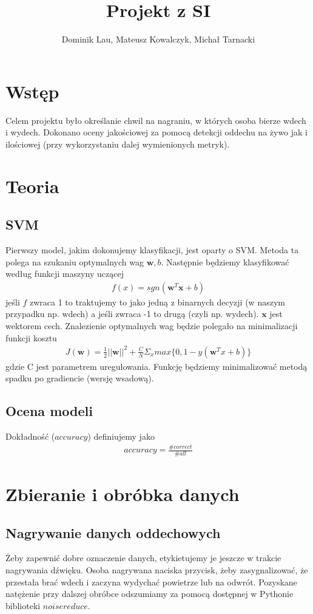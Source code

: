 \documentclass{article}
\title{Projekt z SI}
\author{Dominik Lau, Mateusz Kowalczyk, Michał Tarnacki}
\begin{document}
\maketitle

\section{Wstęp}
Celem projektu było określanie chwil na nagraniu, w których osoba bierze wdech i wydech. 
Dokonano oceny jakościowej za pomocą detekcji oddechu na żywo jak i ilościowej (przy wykorzystaniu
dalej wymienionych metryk).

\section{Teoria}
\subsection{SVM}
Pierwszy model, jakim dokonujemy klasyfikacji, jest oparty o SVM. Metoda ta polega na szukaniu optymalnych wag $\boldsymbol{w}, b$.
Następnie będziemy klasyfikować według funkcji maszyny uczącej 
\begin{gather*}
	f(x) = sgn(\boldsymbol{w}^T \boldsymbol{x} + b)
\end{gather*}
jeśli $f$ zwraca 1 to traktujemy to jako jedną z binarnych decyzji (w naszym przypadku np. wdech) a jeśli zwraca -1 to drugą (czyli np. wydech).
$\textbf{x}$ jest wektorem cech.  Znalezienie optymalnych wag będzie polegało na minimalizacji
funkcji kosztu
\begin{gather*}
	J(\boldsymbol{w}) = \frac{1}{2}||\boldsymbol{w}||^2 + \frac{C}{N}\Sigma_x max\{0, 1 - y(\boldsymbol{w}^Tx + b)\}
\end{gather*}
gdzie C jest parametrem uregulowania. Funkcję będziemy minimalizować metodą spadku po gradiencie (wersję wsadową).
\subsection{Ocena modeli}
Dokładność ($accuracy$) definiujemy jako
\begin{gather*}
	accuracy = \frac{\# correct}{\# all}
\end{gather*}

\section{Zbieranie i obróbka danych}
\subsection{Nagrywanie danych oddechowych}
Żeby zapewnić dobre oznaczenie danych, etykietujemy je jeszcze w trakcie nagrywania dźwięku. 
Osoba nagrywana naciska przycisk, żeby zasygnalizować, że przestała brać wdech i zaczyna wydychać 
powietrze lub na odwrót. Pozyskane natężenie przy dalszej obróbce odszumiamy za pomocą dostępnej
w Pythonie biblioteki $noisereduce$.
\end{document}

